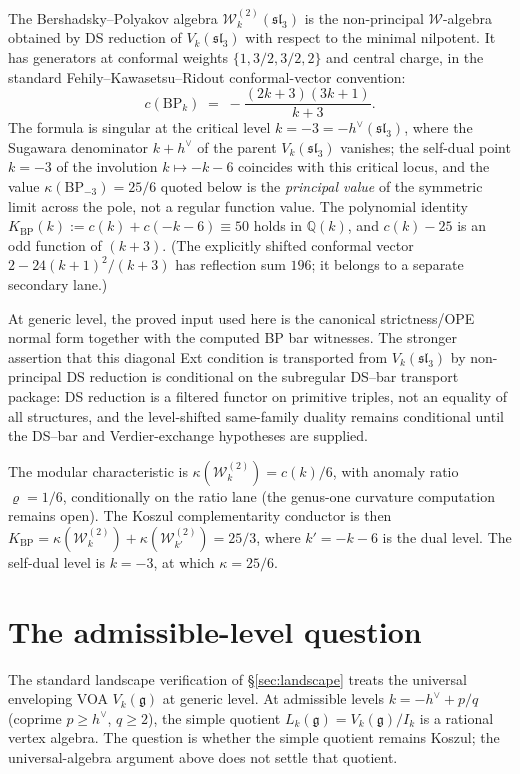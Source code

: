 \documentclass[11pt,reqno]{amsart}
\theoremstyle{definition}
\theoremstyle{remark}
\newcommand{\cW}{\mathcal{W}}
\newcommand{\fg}{\mathfrak{g}}
\numberwithin{equation}{section}
\begin{document}
The Bershadsky--Polyakov algebra
$\cW^{(2)}_k(\mathfrak{sl}_3)$ is the non-principal
$\cW$-algebra obtained by DS reduction of
$V_k(\mathfrak{sl}_3)$ with respect to the minimal nilpotent.
It has generators at conformal weights $\{1, 3/2, 3/2, 2\}$
and central charge, in the standard Fehily--Kawasetsu--Ridout
conformal-vector convention:
\[
 c(\mathrm{BP}_k) \;=\; -\frac{(2k+3)(3k+1)}{k+3}.
\]
The formula is singular at the critical level $k = -3 = -h^\vee(\mathfrak{sl}_3)$, where the Sugawara denominator $k+h^\vee$ of the parent $V_k(\mathfrak{sl}_3)$ vanishes; the self-dual point $k=-3$ of the involution $k \mapsto -k - 6$ coincides with this critical locus, and the value $\kappa(\mathrm{BP}_{-3}) = 25/6$ quoted below is the \emph{principal value} of the symmetric limit across the pole, not a regular function value. The polynomial identity $K_{\mathrm{BP}}(k) := c(k) + c(-k-6) \equiv 50$ holds in $\mathbb{Q}(k)$, and $c(k) - 25$ is an odd function of $(k+3)$. \textup{(}The explicitly shifted conformal vector $2 - 24(k+1)^2/(k+3)$ has reflection sum $196$; it belongs to a separate secondary lane.\textup{)}

At generic level, the proved input used here is the canonical
strictness/OPE normal form together with the computed BP bar witnesses.
The stronger assertion that this diagonal Ext condition is transported
from $V_k(\mathfrak{sl}_3)$ by non-principal DS reduction is conditional
on the subregular DS--bar transport package: DS reduction is a filtered
functor on primitive triples, not an equality of all structures, and
the level-shifted same-family duality remains conditional until the
DS--bar and Verdier-exchange hypotheses are supplied.

The modular characteristic is $\kappa(\cW^{(2)}_k) = c(k)/6$,
with anomaly ratio $\varrho = 1/6$, conditionally on the ratio lane
(the genus-one curvature computation remains open). The Koszul
complementarity conductor is then
$K_{\mathrm{BP}} = \kappa(\cW^{(2)}_k) + \kappa(\cW^{(2)}_{k'})
= 25/3$,
where $k' = -k - 6$ is the dual level.
The self-dual level is $k = -3$, at which
$\kappa = 25/6$.


\section{The admissible-level question}
\label{sec:admissible}

The standard landscape verification of
\S\ref{sec:landscape} treats the universal enveloping VOA
$V_k(\fg)$ at generic level. At admissible levels
$k = -h^\vee + p/q$ (coprime $p \geq h^\vee$, $q \geq 2$), the
simple quotient $L_k(\fg) = V_k(\fg)/I_k$ is a rational
vertex algebra. The question is whether the simple quotient
remains Koszul; the universal-algebra argument above does not
settle that quotient.
\end{document}
